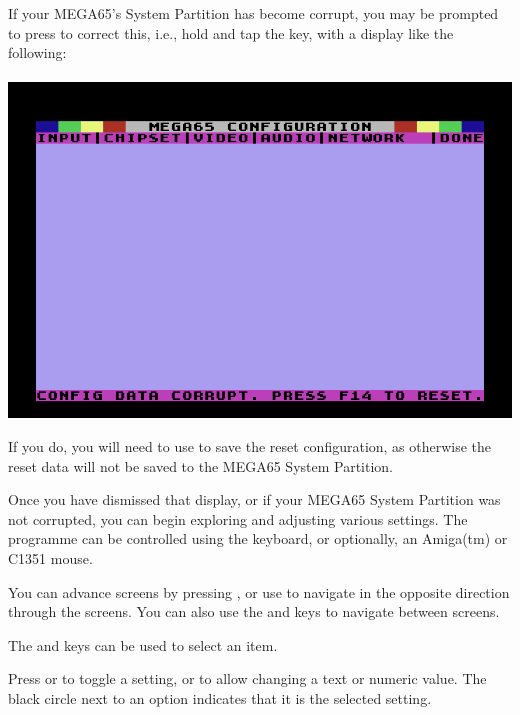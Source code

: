 \begin{minipage}{\linewidth}
  If your MEGA65's System Partition has become corrupt, you may be
  prompted to press  to correct this, i.e., hold  and tap
  the  key, with a display like the following: \\
  \\
  \includegraphics[width=\linewidth]{images/ss-m65config-corrupt.png}
\end{minipage}

If you do, you will
need to use  to save the reset configuration, as otherwise
the reset data will not be saved to the MEGA65 System
Partition.

Once you have dismissed that display, or if your MEGA65 System
Partition was not corrupted, you can begin exploring and adjusting
various settings.  The programme can be controlled using the keyboard, or
optionally, an Amiga(tm) or C1351 mouse.

You can advance screens by pressing , or use 
to navigate in the opposite direction through the screens. You can also
use the \megakey{$\leftarrow$} and \megakey{$\rightarrow$} keys to
navigate between screens.

The
\megakey{$\uparrow$} and \megakey{$\downarrow$} keys can be used to
select an item.

Press  or  to toggle a setting, or to
allow changing a text or numeric value.  The black circle next to an
option indicates that it is the selected setting.

